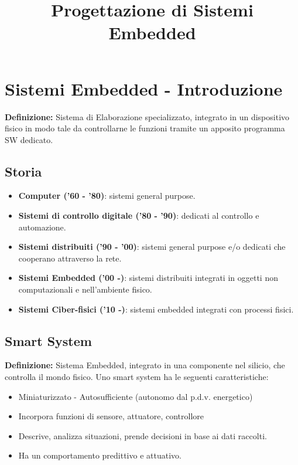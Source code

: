 \documentclass[a4paper]{article}
\title{Progettazione di Sistemi Embedded}
\date{}
\theoremstyle{definition}
\begin{document}
	\begin{frontespizio}
		\Titoletto{}
	\end{frontespizio}

	\tableofcontents
	
	\newpage
	
	\section{Sistemi Embedded - Introduzione}
		\textbf{Definizione:} Sistema di Elaborazione specializzato, integrato in un dispositivo fisico in modo tale da controllarne le funzioni tramite un apposito programma SW dedicato.

	\subsection{Storia}
		\begin{itemize}
			\item \textbf{Computer ('60 - '80)}: sistemi general purpose.
			\item \textbf{Sistemi di controllo digitale ('80 - '90)}: dedicati al controllo e automazione.
			\item \textbf{Sistemi distribuiti ('90 - '00)}: sistemi general purpose e/o dedicati che cooperano attraverso la rete.
			\item \textbf{Sistemi Embedded ('00 -)}: sistemi distribuiti integrati in oggetti non computazionali e nell'ambiente fisico.
			\item \textbf{Sistemi Ciber-fisici ('10 -)}: sistemi embedded integrati con processi fisici.
		\end{itemize}
	
	\subsection{Smart System}
		\textbf{Definizione:} Sistema Embedded, integrato in una componente nel silicio, che controlla il mondo fisico. Uno smart system ha le seguenti caratteristiche:
		\begin{itemize}
			\item Miniaturizzato - Autosufficiente (autonomo dal p.d.v. energetico)
			\item Incorpora funzioni di sensore, attuatore, controllore
			\item Descrive, analizza situazioni, prende decisioni in base ai dati raccolti.
			\item Ha un comportamento predittivo e attuativo.
		\end{itemize}
		
\end{document}
